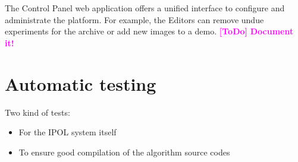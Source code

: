 \documentclass[a4paper,12pt]{article}
\newcommand{\ToDo}[1]{\textcolor{magenta}{\textbf{[ToDo]} \textbf{#1}}}
\begin{document}
The Control Panel web application offers a unified interface to configure and administrate the platform. For example, the Editors can remove undue experiments for the archive or add new images to a demo.
\ToDo{Document it!}

\section{Automatic testing}
Two kind of tests:
\begin{itemize}
  \item For the IPOL system itself
  \item To ensure good compilation of the algorithm source codes
\end{itemize}



\end{document}
